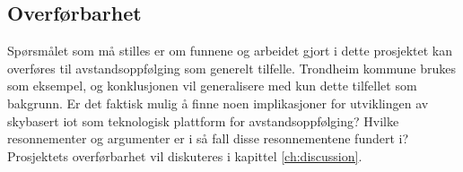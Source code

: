 \subsection{Overførbarhet}
Spørsmålet som må stilles er om funnene og arbeidet gjort i dette prosjektet kan overføres til avstandsoppfølging som generelt tilfelle.
Trondheim kommune brukes som eksempel, og konklusjonen vil generalisere med kun dette tilfellet som bakgrunn.
Er det faktisk mulig å finne noen implikasjoner for utviklingen av skybasert \gls{iot} som teknologisk plattform for avstandsoppfølging?
Hvilke resonnementer og argumenter er i så fall disse resonnementene fundert i? Prosjektets overførbarhet vil diskuteres i
kapittel \ref{ch:discussion}.

